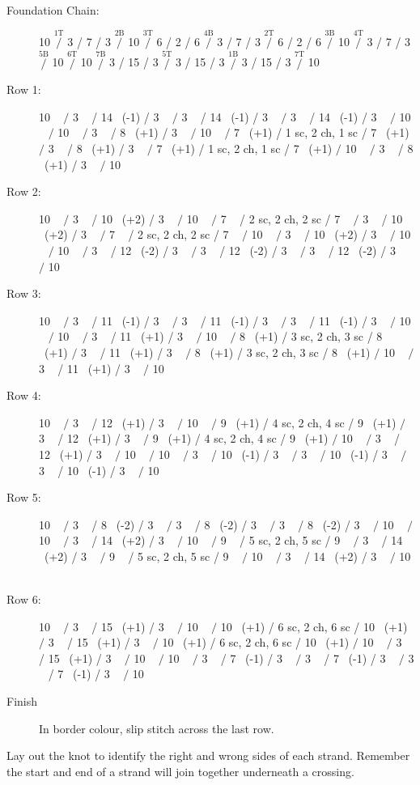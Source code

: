 \documentclass[openany]{book}
\newcommand{\ch}{}%
\renewcommand{\sc}{}%
\newcommand{\m}[1]{$\stackrel{{\text{#1}}}{/}$}
\begin{document}
\begin{description}
\item[Foundation Chain:]
10 \ch \m{1T}
3 \ch / 7 \ch / 3 \ch \m{2B}
10 \ch \m{3T}
6 \ch /  2 \ch /  6 \m{4B}
3 \ch / 7 \ch / 3 \ch \m{2T}
6 \ch /  2 \ch /  6 \m{3B}
10 \ch \m{4T}
3 \ch / 7 \ch / 3 \ch \m{5B}
10 \ch \m{6T}
10 \ch \m{7B}
3 \ch / 15 \ch / 3 \ch \m{5T}
3 \ch / 15 \ch / 3 \ch \m{1B}
3 \ch / 15 \ch / 3 \ch \m{7T}
10 \ch 
\item[Row 1:]
10 \sc~ \m{}
3 \sc~ / 14 \sc~(-1) / 3 \sc~ \m{}
3 \sc~ / 14 \sc~(-1) / 3 \sc~ \m{}
3 \sc~ / 14 \sc~(-1) / 3 \sc~ \m{}
10 \sc~ \m{}
10 \sc~ \m{}
3 \sc~ / 8 \sc~(+1) / 3 \sc~ \m{}
10 \sc~ \m{}
7 \sc~(+1) /  1 sc, 2 ch, 1 sc /  7 \sc~(+1) \m{}
3 \sc~ / 8 \sc~(+1) / 3 \sc~ \m{}
7 \sc~(+1) /  1 sc, 2 ch, 1 sc /  7 \sc~(+1) \m{}
10 \sc~ \m{}
3 \sc~ / 8 \sc~(+1) / 3 \sc~ \m{}
10 \sc~ 
\item[Row 2:]
10 \sc~ \m{}
3 \sc~ / 10 \sc~(+2) / 3 \sc~ \m{}
10 \sc~ \m{}
7 \sc~ /  2 sc, 2 ch, 2 sc /  7 \sc~ \m{}
3 \sc~ / 10 \sc~(+2) / 3 \sc~ \m{}
7 \sc~ /  2 sc, 2 ch, 2 sc /  7 \sc~ \m{}
10 \sc~ \m{}
3 \sc~ / 10 \sc~(+2) / 3 \sc~ \m{}
10 \sc~ \m{}
10 \sc~ \m{}
3 \sc~ / 12 \sc~(-2) / 3 \sc~ \m{}
3 \sc~ / 12 \sc~(-2) / 3 \sc~ \m{}
3 \sc~ / 12 \sc~(-2) / 3 \sc~ \m{}
10 \sc~ 
\item[Row 3:]
10 \sc~ \m{}
3 \sc~ / 11 \sc~(-1) / 3 \sc~ \m{}
3 \sc~ / 11 \sc~(-1) / 3 \sc~ \m{}
3 \sc~ / 11 \sc~(-1) / 3 \sc~ \m{}
10 \sc~ \m{}
10 \sc~ \m{}
3 \sc~ / 11 \sc~(+1) / 3 \sc~ \m{}
10 \sc~ \m{}
8 \sc~(+1) /  3 sc, 2 ch, 3 sc /  8 \sc~(+1) \m{}
3 \sc~ / 11 \sc~(+1) / 3 \sc~ \m{}
8 \sc~(+1) /  3 sc, 2 ch, 3 sc /  8 \sc~(+1) \m{}
10 \sc~ \m{}
3 \sc~ / 11 \sc~(+1) / 3 \sc~ \m{}
10 \sc~ 
\item[Row 4:]
10 \sc~ \m{}
3 \sc~ / 12 \sc~(+1) / 3 \sc~ \m{}
10 \sc~ \m{}
9 \sc~(+1) /  4 sc, 2 ch, 4 sc /  9 \sc~(+1) \m{}
3 \sc~ / 12 \sc~(+1) / 3 \sc~ \m{}
9 \sc~(+1) /  4 sc, 2 ch, 4 sc /  9 \sc~(+1) \m{}
10 \sc~ \m{}
3 \sc~ / 12 \sc~(+1) / 3 \sc~ \m{}
10 \sc~ \m{}
10 \sc~ \m{}
3 \sc~ / 10 \sc~(-1) / 3 \sc~ \m{}
3 \sc~ / 10 \sc~(-1) / 3 \sc~ \m{}
3 \sc~ / 10 \sc~(-1) / 3 \sc~ \m{}
10 \sc~ 
\item[Row 5:]
10 \sc~ \m{}
3 \sc~ / 8 \sc~(-2) / 3 \sc~ \m{}
3 \sc~ / 8 \sc~(-2) / 3 \sc~ \m{}
3 \sc~ / 8 \sc~(-2) / 3 \sc~ \m{}
10 \sc~ \m{}
10 \sc~ \m{}
3 \sc~ / 14 \sc~(+2) / 3 \sc~ \m{}
10 \sc~ \m{}
9 \sc~ /  5 sc, 2 ch, 5 sc /  9 \sc~ \m{}
3 \sc~ / 14 \sc~(+2) / 3 \sc~ \m{}
9 \sc~ /  5 sc, 2 ch, 5 sc /  9 \sc~ \m{}
10 \sc~ \m{}
3 \sc~ / 14 \sc~(+2) / 3 \sc~ \m{}
10 \sc~ 
\item[Row 6:]
10 \sc~ \m{}
3 \sc~ / 15 \sc~(+1) / 3 \sc~ \m{}
10 \sc~ \m{}
10 \sc~(+1) /  6 sc, 2 ch, 6 sc /  10 \sc~(+1) \m{}
3 \sc~ / 15 \sc~(+1) / 3 \sc~ \m{}
10 \sc~(+1) /  6 sc, 2 ch, 6 sc /  10 \sc~(+1) \m{}
10 \sc~ \m{}
3 \sc~ / 15 \sc~(+1) / 3 \sc~ \m{}
10 \sc~ \m{}
10 \sc~ \m{}
3 \sc~ / 7 \sc~(-1) / 3 \sc~ \m{}
3 \sc~ / 7 \sc~(-1) / 3 \sc~ \m{}
3 \sc~ / 7 \sc~(-1) / 3 \sc~ \m{}
10 \sc~ 
\item[Finish] In border colour, slip stitch across the last row.
\end{description}
Lay out the knot to identify the right and wrong sides of each strand. Remember the start and end of a strand will join together underneath a crossing.
\end{document}
